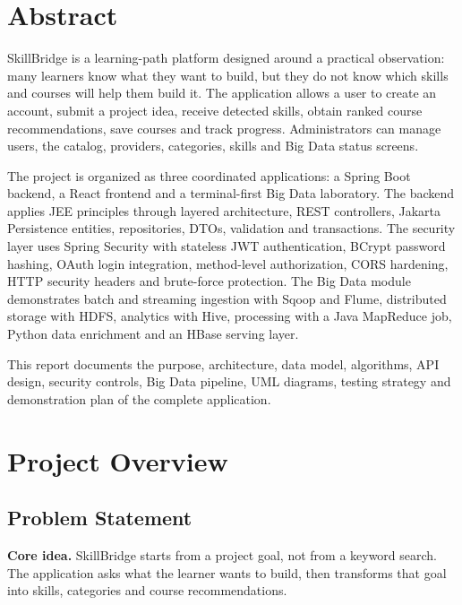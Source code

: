 \documentclass[12pt,a4paper]{report}
\newcommand{\reportnote}[2]{
    \begin{tcolorbox}[
        enhanced,
        colback=#1!10,
        colframe=#1,
        arc=2pt,
        boxrule=0.7pt,
        left=8pt,
        right=8pt,
        top=7pt,
        bottom=7pt
    ]
    #2
    \end{tcolorbox}
}
\newcommand{\projectName}{SkillBridge}
\begin{document}
\chapter*{Abstract}
\reportnote{sbTeal}{\projectName{} is a learning-path platform designed around a practical observation: many learners know what they want to build, but they do not know which skills and courses will help them build it. The application allows a user to create an account, submit a project idea, receive detected skills, obtain ranked course recommendations, save courses and track progress. Administrators can manage users, the catalog, providers, categories, skills and Big Data status screens.}

The project is organized as three coordinated applications: a Spring Boot backend, a React frontend and a terminal-first Big Data laboratory. The backend applies JEE principles through layered architecture, REST controllers, Jakarta Persistence entities, repositories, DTOs, validation and transactions. The security layer uses Spring Security with stateless JWT authentication, BCrypt password hashing, OAuth login integration, method-level authorization, CORS hardening, HTTP security headers and brute-force protection. The Big Data module demonstrates batch and streaming ingestion with Sqoop and Flume, distributed storage with HDFS, analytics with Hive, processing with a Java MapReduce job, Python data enrichment and an HBase serving layer.

This report documents the purpose, architecture, data model, algorithms, API design, security controls, Big Data pipeline, UML diagrams, testing strategy and demonstration plan of the complete application.

\tableofcontents
\listoffigures
\listoftables
\newpage
{}

\chapter{Project Overview}

\section{Problem Statement}
\reportnote{sbOrange}{\textbf{Core idea.} SkillBridge starts from a project goal, not from a keyword search. The application asks what the learner wants to build, then transforms that goal into skills, categories and course recommendations.}
\end{document}
